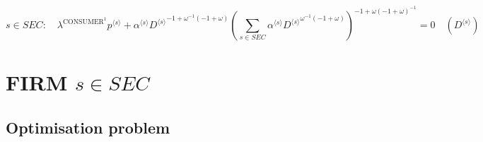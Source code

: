 \begin{equation}
s\in {S\!E\!C}\colon\quad {\lambda^{\mathrm{CONSUMER}^{\mathrm{1}}}} {{p}^{\langle s\rangle}} + {{\alpha}^{\langle s\rangle}} {{{D}^{\langle s\rangle}}^{-1 + {\omega}^{-1} \left(-1 + \omega\right)}} {\left(\sum_{s\in {S\!E\!C}} {{\alpha}^{\langle s\rangle}} {{{D}^{\langle s\rangle}}^{{\omega}^{-1} \left(-1 + \omega\right)}}\right)^{-1 + {\omega} \left(-1 + \omega\right)^{-1}}} = 0
 \quad \left({D}^{\langle s\rangle}\right)
\end{equation}




\section{FIRM $s\in {S\!E\!C}$}

\subsection{Optimisation problem}

